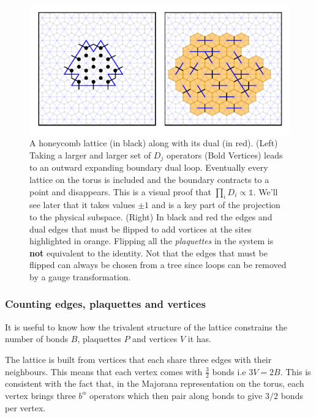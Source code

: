 \begin{figure}
\hypertarget{fig:flood_fill}{%
\centering
\includegraphics[width=1\textwidth,height=\textheight]{figure_code/amk_chapter/intro/flood_fill/flood_fill.pdf}
\caption{A honeycomb lattice (in black) along with its dual (in red). (Left) Taking a larger and larger set of \(D_j\) operators (Bold Vertices) leads to an outward expanding boundary dual loop. Eventually every lattice on the torus is included and the boundary contracts to a point and disappears. This is a visual proof that \(\prod_i D_i \propto \mathbb{1}\). We'll see later that it takes values \(\pm 1\) and is a key part of the projection to the physical subspace. (Right) In black and red the edges and dual edges that must be flipped to add vortices at the sites highlighted in orange. Flipping all the \emph{plaquettes} in the system is \textbf{not} equivalent to the identity. Not that the edges that must be flipped can always be chosen from a tree since loops can be removed by a gauge transformation.}\label{fig:flood_fill}
}
\end{figure}

\hypertarget{counting-edges-plaquettes-and-vertices}{%
\subsubsection{Counting edges, plaquettes and vertices}\label{counting-edges-plaquettes-and-vertices}}

It is useful to know how the trivalent structure of the lattice constrains the number of bonds \(B\), plaquettes \(P\) and vertices \(V\) it has.

The lattice is built from vertices that each share three edges with their neighbours. This means that each vertex comes with \(\tfrac{3}{2}\) bonds i.e \(3V = 2B\). This is consistent with the fact that, in the Majorana representation on the torus, each vertex brings three \(b^\alpha\) operators which then pair along bonds to give \(3/2\) bonds per vertex.

